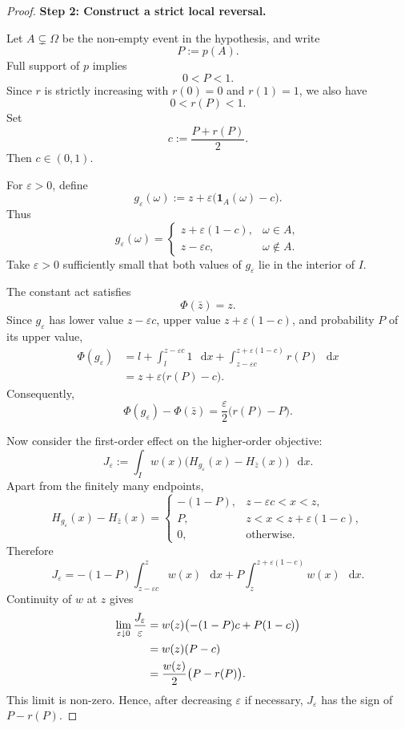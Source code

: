 \documentclass[a4paper,final]{article}
\newcommand*\diff{\mathop{}\!\mathrm{d}}
\newenvironment{CCM rewritten}
{\begingroup\color{blue}} %
{\endgroup}              %
\begin{document}
\begin{proof}
\medskip
\noindent
\textbf{Step 2: Construct a strict local reversal.}

Let \(A\subsetneq\Omega\) be the non-empty event in the hypothesis, and
write
\[
P:=p(A).
\]
Full support of \(p\) implies
\[
0<P<1.
\]
Since \(r\) is strictly increasing with \(r(0)=0\) and \(r(1)=1\),
we also have
\[
0<r(P)<1.
\]
Set
\[
c:=\frac{P+r(P)}{2}.
\]
Then \(c\in(0,1)\).

For \(\varepsilon>0\), define
\[
g_\varepsilon(\omega)
:=
z+\varepsilon\bigl(\mathbf 1_A(\omega)-c\bigr).
\]
Thus
\[
g_\varepsilon(\omega)
=
\begin{cases}
z+\varepsilon(1-c),&\omega\in A,\\
z-\varepsilon c,&\omega\notin A.
\end{cases}
\]
Take \(\varepsilon>0\) sufficiently small that both values of
\(g_\varepsilon\) lie in the interior of \(I\).

The constant act satisfies
\[
\Phi(\bar z)=z.
\]
Since \(g_\varepsilon\) has lower value \(z-\varepsilon c\), upper
value \(z+\varepsilon(1-c)\), and probability \(P\) of its upper
value,
\begin{align}
\Phi(g_\varepsilon)
&=
l+\int_l^{z-\varepsilon c}1\,\diff x
+\int_{z-\varepsilon c}^{z+\varepsilon(1-c)}
r(P)\,\diff x\\
&=
z+\varepsilon\bigl(r(P)-c\bigr).
\end{align}
Consequently,
\begin{equation}
\Phi(g_\varepsilon)-\Phi(\bar z)
=
\frac{\varepsilon}{2}\bigl(r(P)-P\bigr).
\label{eq:individual-comparison}
\end{equation}

Now consider the first-order effect on the higher-order objective:
\[
J_\varepsilon
:=
\int_I
w(x)\bigl(H_{g_\varepsilon}(x)-H_{\bar z}(x)\bigr)
\,\diff x.
\]
Apart from the finitely many endpoints,
\[
H_{g_\varepsilon}(x)-H_{\bar z}(x)
=
\begin{cases}
-(1-P),
&
z-\varepsilon c<x<z,\\
P,
&
z<x<z+\varepsilon(1-c),\\
0,
&
\text{otherwise}.
\end{cases}
\]
Therefore
\[
J_\varepsilon
=
-(1-P)\int_{z-\varepsilon c}^{z}w(x)\,\diff x
+
P\int_z^{z+\varepsilon(1-c)}w(x)\,\diff x.
\]
Continuity of \(w\) at \(z\) gives
\begin{align}
\lim_{\varepsilon\downarrow0}
\frac{J_\varepsilon}{\varepsilon}
&=
w(z)\bigl(-(1-P)c+P(1-c)\bigr)\notag\\
&=
w(z)(P-c)\notag\\
&=
\frac{w(z)}{2}\bigl(P-r(P)\bigr).
\label{eq:higher-order-comparison}
\end{align}
This limit is non-zero. Hence, after decreasing \(\varepsilon\) if
necessary, \(J_\varepsilon\) has the sign of \(P-r(P)\).


\end{proof}
\end{document}
